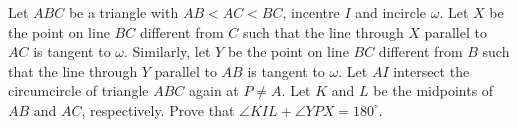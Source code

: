 Let $ABC$ be a triangle with $AB < AC < BC$, incentre $I$ and incircle $\omega$. Let $X$ be the point on line $BC$ different from $C$ such that the line through $X$ parallel to $AC$ is tangent to $\omega$. Similarly, let $Y$ be the point on line $BC$ different from $B$ such that the line through $Y$ parallel to $AB$ is tangent to $\omega$. Let $AI$ intersect the circumcircle of triangle $ABC$ again at $P \neq A$. Let $K$ and $L$ be the midpoints of $AB$ and $AC$, respectively. Prove that $\angle KIL + \angle YPX = 180^\circ$.
